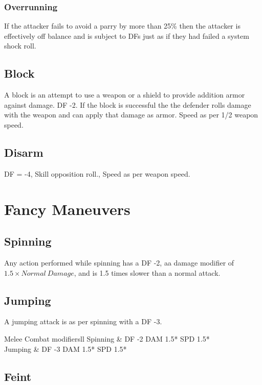 \subsubsection{Overrunning}

If the attacker fails to avoid a parry by more than 25\% then the 
attacker is effectively off balance and is subject to DFs just as if 
they had failed a system shock roll.

\subsection{Block}

A block is an attempt to use a weapon or a shield to provide addition 
armor against damage. DF -2. If the block is successful the the defender rolls
damage with the weapon and can apply that damage as armor. Speed as per 
1/2 weapon speed.

\subsection{Disarm}
DF = -4, Skill opposition roll., Speed as per weapon speed.

\section{Fancy Maneuvers}

\subsection{Spinning}

Any action performed while spinning has a DF -2, aa damage modifier 
of \( 1.5 \times Normal\ Damage \), and is 1.5 times slower than a 
normal attack. 

\subsection{Jumping} 

A jumping attack is as per spinning with a DF -3.

\begin{stable}{Melee Combat modifiers}{ll}
	Spinning		 &		  DF -2 DAM 1.5* SPD 1.5* \\
	Jumping		&		  DF -3 DAM 1.5* SPD 1.5* \\
\end{stable}

\subsection{Feint}

